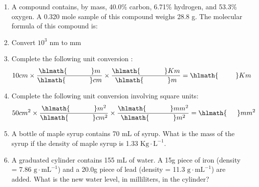 \documentclass[main.tex]{subfiles}
\begin{document}
\clearpage
\newpage
\thispagestyle{empty}
\begin{fullwidth}
\begin{multicols}{2}\begin{enumerate}[resume]  \setlength\itemsep{0.2em}
    \setcounter{enumi}{\theenumTemp}
    
    







\item A compound contains, by mass, 40.0\% carbon, 6.71\% hydrogen, and 53.3\% oxygen. A 0.320 mole sample of this compound weighs 28.8 g. The molecular formula of this compound is:

\vspace{3cm}

\item Convert $10^3$ nm to mm
\vspace{3cm}

\item Complete the following unit conversion :\\
\begin{equation*}10cm \times \dfrac{\hlmath{\hspace{35pt}}m}{\hlmath{\hspace{35pt}}cm} \times \dfrac{\hlmath{\hspace{35pt}}Km}{\hlmath{\hspace{35pt}}m}\\   =\hlmath{\hspace{25pt}}Km\end{equation*}

\item Complete the following unit conversion involving square units:\\
\begin{equation*}50cm^2 \times \dfrac{\hlmath{\hspace{35pt}}m^2}{\hlmath{\hspace{35pt}}cm^2} \times \dfrac{\hlmath{\hspace{35pt}}mm^2}{\hlmath{\hspace{35pt}}m^2} \\ 
 =\hlmath{\hspace{15pt}}mm^2\end{equation*}

\item A bottle of maple syrup contains 70 mL of syrup. What is the mass of the syrup if the density of maple syrup is 1.33 $\text{Kg}\cdot \text{L}^{-1}$.
\vspace{2cm}

\item A graduated cylinder contains 155 mL of water. A 15g piece of iron (density = 7.86 $\text{g}\cdot \text{mL}^{-1}$) and a 20.0g piece of lead (density = 11.3 $\text{g}\cdot \text{mL}^{-1}$) are added. What is the new water level, in milliliters, in the cylinder?
\vspace{2cm}


\end{enumerate}
\end{multicols}
\end{fullwidth}
\end{document}
